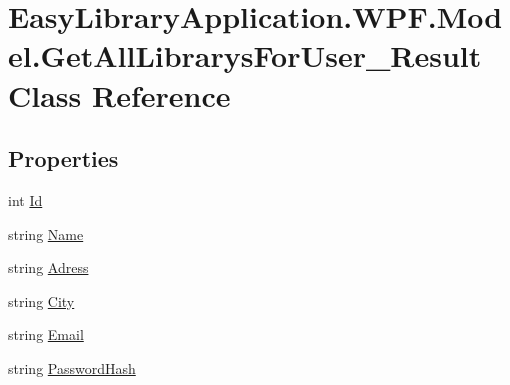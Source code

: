 \hypertarget{class_easy_library_application_1_1_w_p_f_1_1_model_1_1_get_all_librarys_for_user___result}{}\section{Easy\+Library\+Application.\+W\+P\+F.\+Model.\+Get\+All\+Librarys\+For\+User\+\_\+\+Result Class Reference}
\label{class_easy_library_application_1_1_w_p_f_1_1_model_1_1_get_all_librarys_for_user___result}
\subsection*{Properties}
\begin{DoxyCompactItemize}
\item 
int \mbox{\hyperlink{class_easy_library_application_1_1_w_p_f_1_1_model_1_1_get_all_librarys_for_user___result_a0252c669221b8093c811d12862607b9c}{Id}}
\item 
string \mbox{\hyperlink{class_easy_library_application_1_1_w_p_f_1_1_model_1_1_get_all_librarys_for_user___result_a9862a5ba0d5daef202498d08219d7494}{Name}}
\item 
string \mbox{\hyperlink{class_easy_library_application_1_1_w_p_f_1_1_model_1_1_get_all_librarys_for_user___result_a2f19e8ca9b4bf8fd3a599298e5e011e6}{Adress}}
\item 
string \mbox{\hyperlink{class_easy_library_application_1_1_w_p_f_1_1_model_1_1_get_all_librarys_for_user___result_a5cb3bb58b346029daf8eb570c32d9978}{City}}
\item 
string \mbox{\hyperlink{class_easy_library_application_1_1_w_p_f_1_1_model_1_1_get_all_librarys_for_user___result_a053d71052bcd9000874dc093b2cfd365}{Email}}
\item 
string \mbox{\hyperlink{class_easy_library_application_1_1_w_p_f_1_1_model_1_1_get_all_librarys_for_user___result_ad2c57e3462d07f1d4e06a44f85951a9e}{Password\+Hash}}

\end{DoxyCompactItemize}
